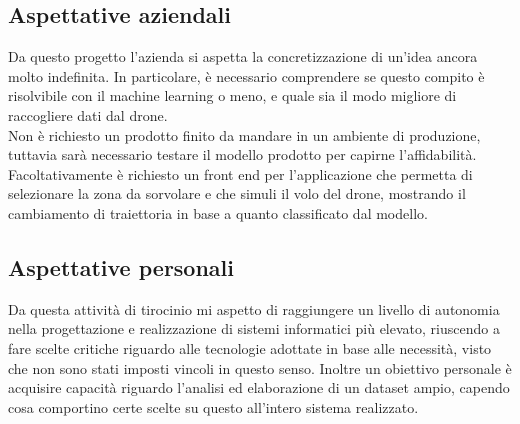 \subsection{Aspettative aziendali}
Da questo progetto l'azienda si aspetta la concretizzazione di un'idea ancora molto indefinita. In particolare, è necessario comprendere se questo compito
è risolvibile con il machine learning o meno, e quale sia il modo migliore di raccogliere dati dal drone.\\
Non è richiesto un prodotto finito da mandare in un ambiente di produzione, tuttavia sarà necessario testare il modello prodotto per capirne l'affidabilità.\\
Facoltativamente è richiesto un front end per l'applicazione che permetta di selezionare la zona da sorvolare e che simuli il volo del drone, mostrando il cambiamento
di traiettoria in base a quanto classificato dal modello.

\subsection{Aspettative personali}
Da questa attività di tirocinio mi aspetto di raggiungere un livello di autonomia nella progettazione e realizzazione di sistemi informatici più elevato,
riuscendo a fare scelte critiche riguardo alle tecnologie adottate in base alle necessità, visto che non sono stati imposti vincoli in questo senso.
Inoltre un obiettivo personale è acquisire capacità riguardo l'analisi ed elaborazione di un dataset ampio, capendo cosa comportino certe scelte su questo
all'intero sistema realizzato.

